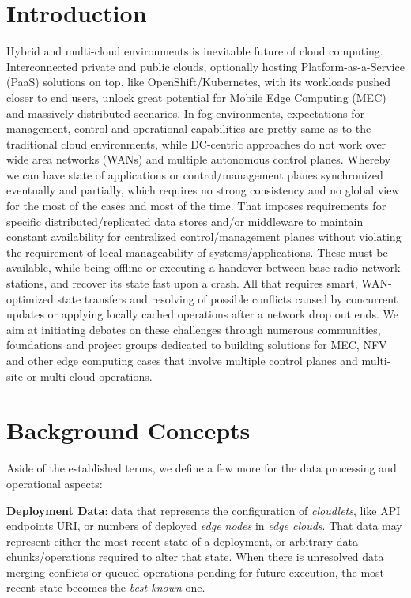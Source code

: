 \documentclass[conference]{IEEEtran}
\begin{document}
\section{Introduction}
Hybrid and multi-cloud environments is inevitable future of cloud computing.
Interconnected private and public clouds, optionally hosting
Platform-as-a-Service (PaaS) solutions on top, like OpenShift/Kubernetes, with
its workloads pushed closer to end users, unlock great potential for Mobile
Edge Computing (MEC) and massively distributed scenarios. In fog environments,
expectations for management, control and operational capabilities are pretty
same as to the traditional cloud environments, while DC-centric approaches do
not work over wide area networks (WANs) and multiple autonomous control planes.
Whereby we can have state of applications or control/management planes
synchronized eventually and partially, which requires no strong consistency and
no global view for the most of the cases and most of the time. That imposes
requirements for specific distributed/replicated data stores and/or middleware
to maintain constant availability for centralized control/management planes
without violating the requirement of local manageability of
systems/applications. These must be available, while being offline or executing
a handover between base radio network stations, and recover its state fast upon
a crash. All that requires smart, WAN-optimized state transfers and resolving
of possible conflicts caused by concurrent updates or applying locally cached
operations after a network drop out ends. We aim at initiating debates on these
challenges through numerous communities, foundations and project groups
dedicated to building solutions for MEC, NFV and other edge computing cases
that involve multiple control planes and multi-site or multi-cloud operations.

\section{Background Concepts}
Aside of the established terms\cite{b3}, we define a few more for the data
processing and operational aspects:

\textbf{Deployment Data}: data that represents the configuration of
\textit{cloudlets}\cite{b3}, like API endpoints URI, or numbers of deployed
\textit{edge nodes}\cite{b3} in \textit{edge clouds}\cite{b3}. That data may
represent either the most recent state of a deployment, or arbitrary data
chunks/operations required to alter that state. When there is unresolved data
merging conflicts or queued operations pending for future execution, the most
recent state becomes the \textit{best known} one.
\end{document}
